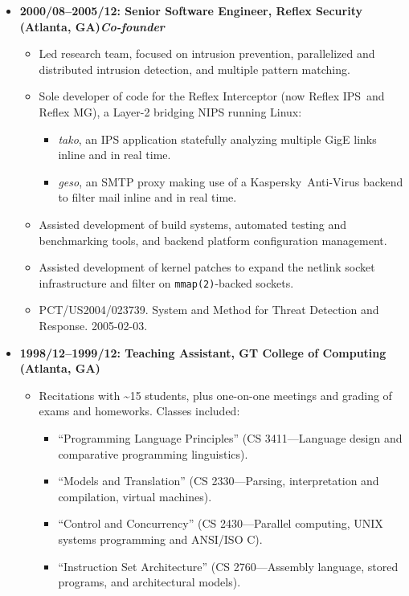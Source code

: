 \documentclass{article}
\newenvironment{tightitemize}
{\begin{itemize}
  \setlength{\itemsep}{1pt}
  \setlength{\parskip}{0pt}
  \setlength{\parsep}{0pt}}
{\end{itemize}}
\begin{document}
\begin{tightitemize}
\item \textbf{2000/08--2005/12: Senior Software Engineer, Reflex Security (Atlanta, GA)\hfill \tiny{\textit{Co-founder}}}
\begin{tightitemize}
\item Led research team, focused on intrusion prevention, parallelized and
  distributed intrusion detection, and multiple pattern matching.
\item Sole developer of code for the Reflex Interceptor (now Reflex IPS\texttrademark\ and
  Reflex MG\texttrademark), a Layer-2 bridging NIPS running Linux:
\begin{tightitemize}
    \item \textit{tako}, an IPS application statefully analyzing multiple GigE links inline
      and in real time.
    \item \textit{geso}, an SMTP proxy making use of a Kaspersky\texttrademark\ Anti-Virus backend to
      filter mail inline and in real time.
\end{tightitemize}
\item Assisted development of build systems, automated testing and benchmarking tools, and backend
      platform configuration management.
\item Assisted development of kernel patches to expand the netlink socket
      infrastructure and filter on \texttt{mmap(2)}-backed sockets.
\item PCT/US2004/023739. System and Method for Threat Detection and Response. 2005-02-03.\hfill {}\\
\end{tightitemize}

\item \textbf{1998/12--1999/12: Teaching Assistant, GT College of Computing (Atlanta, GA)}
\begin{tightitemize}
\item Recitations with \textasciitilde15 students, plus one-on-one meetings and grading of exams
and homeworks. Classes included:
\begin{tightitemize}
\item ``Programming Language Principles'' (CS 3411---Language design and comparative programming linguistics).
\item ``Models and Translation'' (CS 2330---Parsing, interpretation and compilation, virtual machines).
\item ``Control and Concurrency'' (CS 2430---Parallel computing, UNIX systems programming and ANSI/ISO C).
\item ``Instruction Set Architecture'' (CS 2760---Assembly language, stored programs, and architectural models).\\
\end{tightitemize}
\end{tightitemize}


\end{tightitemize}
\end{document}
